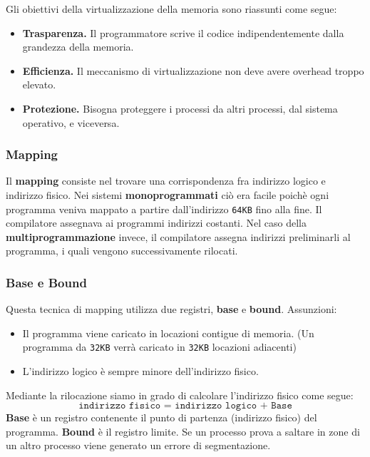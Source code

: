 \documentclass[12pt, letterpaper]{article}
\begin{document}
				Gli obiettivi della virtualizzazione della memoria sono riassunti come segue:
				\begin{itemize}
					\item \textbf{Trasparenza.} Il programmatore scrive il codice indipendentemente dalla grandezza della memoria.
					\item \textbf{Efficienza.} Il meccanismo di virtualizzazione non deve avere overhead troppo elevato.
					\item \textbf{Protezione.} Bisogna proteggere i processi da altri processi, dal sistema operativo, e viceversa.
				\end{itemize}
				
			\subsubsection{Mapping}
				Il \textbf{mapping} consiste nel trovare una corrispondenza fra indirizzo logico e indirizzo fisico. Nei sistemi \textbf{monoprogrammati} ciò era facile poichè ogni programma veniva mappato a partire dall'indirizzo \texttt{64KB} fino alla fine. Il compilatore assegnava ai programmi indirizzi costanti. Nel caso della \textbf{multiprogrammazione} invece, il compilatore assegna indirizzi preliminarli al programma, i quali  vengono successivamente rilocati. 
			
			\subsubsection{Base e Bound}
				Questa tecnica di mapping utilizza due registri, \textbf{base} e \textbf{bound}.
				Assunzioni: 
				\begin{itemize}
					\item Il programma viene caricato in locazioni contigue di memoria. (Un programma da \texttt{32KB} verrà caricato in \texttt{32KB} locazioni adiacenti)
					\item L'indirizzo logico è sempre minore dell'indirizzo fisico.
				\end{itemize}
				Mediante la rilocazione siamo in grado di calcolare l'indirizzo fisico come segue: 
				$$\texttt{indirizzo fisico = indirizzo logico + Base}$$
				\textbf{Base} è un registro contenente il punto di partenza (indirizzo fisico) del programma. \textbf{Bound} è il registro limite. Se un processo prova a saltare in zone di un altro processo viene generato un errore di segmentazione.
				
\end{document}
